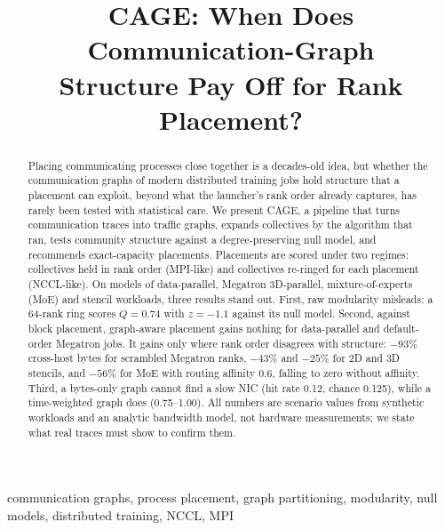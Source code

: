 \documentclass[conference]{IEEEtran}
\begin{document}
\title{CAGE: When Does Communication-Graph\\Structure Pay Off for Rank Placement?}

\author{
}

\maketitle

\begin{abstract}
Placing communicating processes close together is a decades-old idea, but whether the
communication graphs of modern distributed training jobs hold structure that a placement can
exploit, beyond what the launcher's rank order already captures, has rarely been tested with
statistical care. We present CAGE, a pipeline that turns communication traces into traffic
graphs, expands collectives by the algorithm that ran, tests community structure against a
degree-preserving null model, and recommends exact-capacity placements. Placements are scored
under two regimes: collectives held in rank order (MPI-like) and collectives re-ringed for each
placement (NCCL-like). On models of data-parallel, Megatron 3D-parallel, mixture-of-experts (MoE)
and stencil workloads, three results stand out. First, raw modularity misleads: a 64-rank ring
scores $Q=0.74$ with $z=-1.1$ against its null model. Second, against block placement, graph-aware
placement gains nothing for data-parallel and default-order Megatron jobs. It gains only where rank
order disagrees with structure: $-93\%$ cross-host bytes for scrambled Megatron ranks, $-43\%$ and
$-25\%$ for 2D and 3D stencils, and $-56\%$ for MoE with routing affinity 0.6, falling to zero
without affinity. Third, a bytes-only graph cannot find a slow NIC (hit rate 0.12, chance 0.125),
while a time-weighted graph does (0.75--1.00). All numbers are scenario values from synthetic
workloads and an analytic bandwidth model, not hardware measurements; we state what real traces
must show to confirm them.
\end{abstract}

\begin{IEEEkeywords}
communication graphs, process placement, graph partitioning, modularity, null models,
distributed training, NCCL, MPI
\end{IEEEkeywords}
\end{document}
